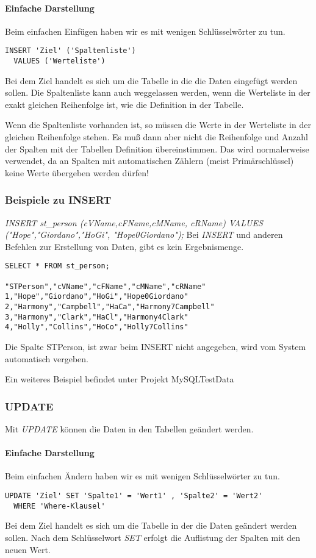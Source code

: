 \paragraph{Einfache Darstellung}
Beim einfachen Einfügen haben wir es mit wenigen Schlüsselwörter zu tun.
\begin{verbatim}
INSERT 'Ziel' ('Spaltenliste')
  VALUES ('Werteliste')
\end{verbatim}
Bei dem Ziel handelt es sich um die Tabelle in die die Daten eingefügt werden sollen. Die Spaltenliste kann auch weggelassen werden, wenn die Werteliste in der exakt gleichen Reihenfolge ist, wie die Definition in der Tabelle. 

Wenn die Spaltenliste vorhanden ist, so müssen die Werte in der Werteliste in der gleichen Reihenfolge stehen. Es muß dann aber nicht die Reihenfolge und Anzahl der Spalten mit der Tabellen Definition übereinstimmen. Das wird normalerweise verwendet, da an Spalten mit automatischen Zählern (meist Primärschlüssel) keine Werte übergeben werden dürfen!

\subsubsection{Beispiele zu INSERT}
\emph{INSERT st\_person (cVName,cFName,cMName, cRName) VALUES ("Hope","Giordano","HoGi", "Hope0Giordano");}
Bei \emph{INSERT} und anderen Befehlen zur Erstellung von Daten, gibt es kein Ergebnismenge.
\begin{verbatim}
SELECT * FROM st_person;

"STPerson","cVName","cFName","cMName","cRName"
1,"Hope","Giordano","HoGi","Hope0Giordano"
2,"Harmony","Campbell","HaCa","Harmony7Campbell"
3,"Harmony","Clark","HaCl","Harmony4Clark"
4,"Holly","Collins","HoCo","Holly7Collins"
\end{verbatim}
Die Spalte STPerson, ist zwar beim INSERT nicht angegeben, wird vom System automatisch vergeben.

Ein weiteres Beispiel befindet unter Projekt MySQLTestData

\subsubsection{UPDATE}
Mit \emph{UPDATE} können die Daten in den Tabellen geändert werden.
\paragraph{Einfache Darstellung}
Beim einfachen Ändern haben wir es mit wenigen Schlüsselwörter zu tun.
\begin{verbatim}
UPDATE 'Ziel' SET 'Spalte1' = 'Wert1' , 'Spalte2' = 'Wert2' 
  WHERE 'Where-Klausel'
\end{verbatim}
Bei dem Ziel handelt es sich um die Tabelle in der die Daten geändert werden sollen. Nach dem Schlüsselwort \emph{SET} erfolgt die Auflistung der Spalten mit den neuen Wert.

